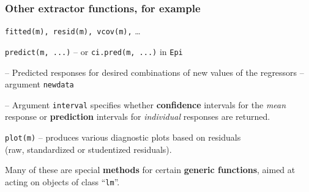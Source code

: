 \documentclass[12pt,dvipsnames,t,handout%
,aspectratio=169%
]{beamer}
\begin{document}
\begin{frame}[fragile]\frametitle{Other extractor functions, for example}

\bi
\item \texttt{fitted(m), resid(m), vcov(m),} \dots 
\medskip
\item \texttt{predict(m, ...)} -- or {\tt ci.pred(m, ...)} in {\tt Epi} 
\bi
{\normalsize
\item[--] Predicted responses for desired combinations 
of new values of the regressors -- argument {\tt newdata}
\medskip
\item[--] Argument {\tt interval} specifies whether
{\bf confidence} intervals for the {\it mean} response or 
{\bf prediction} intervals
for {\it individual} responses are returned.
}
\ei
\item \texttt{plot(m)} -- produces various diagnostic plots based
on residuals \\ (raw, standardized or studentized residuals).
\ei

Many of these are special {\bf methods} for certain {\bf generic functions},  
aimed at acting on objects of class ``{\tt lm}''.  

 
\vfill
\end{frame}
\end{document}
